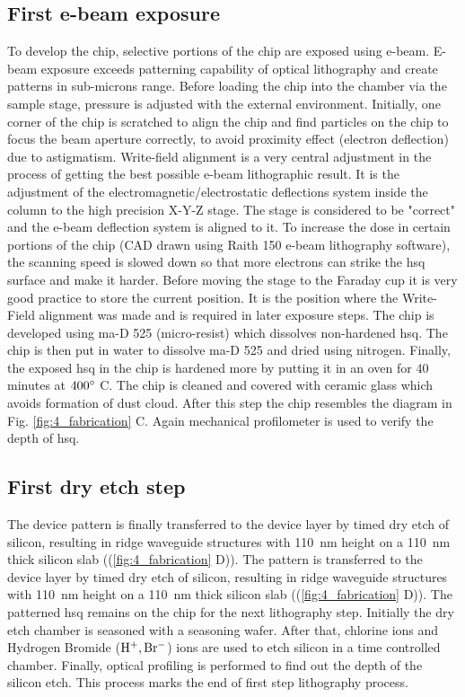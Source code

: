 \documentclass[../report.tex]{subfiles}
\begin{document}
\subsection{First e-beam exposure}
To develop the chip, selective portions of the chip are exposed using e-beam. E-beam exposure exceeds patterning capability of optical lithography and create patterns in sub-microns range. Before loading the chip into the chamber via the sample stage, pressure is adjusted with the external environment. Initially, one corner of the chip is scratched to align the chip and find particles on the chip to focus the beam aperture correctly, to avoid proximity effect (electron deflection) due to astigmatism. Write-field alignment is a very central adjustment in the process of getting the best possible e-beam lithographic result. It is the adjustment of the electromagnetic/electrostatic deflections system inside the column to the high precision X-Y-Z stage. The stage is considered to be "correct" and the e-beam deflection system is aligned to it. To increase the dose in certain portions of the chip (CAD drawn using Raith 150 e-beam lithography software), the scanning speed is slowed down so that more electrons can strike the \gls{hsq} surface and make it harder. Before moving the stage to the Faraday cup it is very good practice to store the current position. It is the position where the Write-Field alignment was made and is required in later exposure steps. The chip is developed using ma-D 525 (micro-resist) which dissolves non-hardened \gls{hsq}. The chip is then put in water to dissolve ma-D 525 and dried using nitrogen. Finally, the exposed \gls{hsq} in the chip is hardened more by putting it in an oven for 40 minutes at $\mathrm{400^{\circ}}$ C. The chip is cleaned and covered with ceramic glass which avoids formation of dust cloud. After this step the chip resembles the diagram in Fig. \ref{fig:4_fabrication} C. Again mechanical profilometer is used to verify the depth of \gls{hsq}.    

\subsection{First dry etch step}
The device pattern is finally transferred to the device layer by timed dry etch of silicon, resulting in ridge waveguide structures with \SI{110}{\nano \meter} height on a \SI{110}{\nano \meter} thick silicon slab ((\ref{fig:4_fabrication} D)). The pattern is transferred to the device layer by timed dry etch of silicon, resulting in ridge waveguide structures with \SI{110}{\nano \meter} height on a \SI{110}{\nano \meter} thick silicon slab ((\ref{fig:4_fabrication} D)). The patterned \gls{hsq} remains on the chip for the next lithography step. Initially the dry etch chamber is seasoned with a seasoning wafer. After that, chlorine ions and Hydrogen Bromide ($\mathrm{H^{+}, Br^{-}}$) ions are used to etch silicon in a time controlled chamber. Finally, optical profiling is performed to find out the depth of the silicon etch. This process marks the end of first step lithography process.
\end{document}
